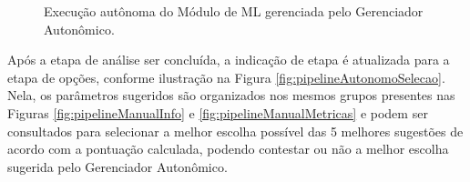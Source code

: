 \documentclass[portugues]{ic-tese}
\begin{document}
\begin{figure}[H]
    \centering
    \caption{Execução autônoma do Módulo de ML gerenciada pelo Gerenciador Autonômico.}
    \label{fig:pipelineAutonomo}
\end{figure}

Após a etapa de análise ser concluída, a indicação de etapa é atualizada para a etapa de opções, conforme ilustração na Figura \ref{fig:pipelineAutonomoSelecao}. Nela, os parâmetros sugeridos são organizados nos mesmos grupos presentes nas Figuras \ref{fig:pipelineManualInfo} e \ref{fig:pipelineManualMetricas} e podem ser consultados para selecionar a melhor escolha possível das 5 melhores sugestões de acordo com a pontuação calculada, podendo contestar ou não a melhor escolha sugerida pelo Gerenciador Autonômico.
\end{document}
